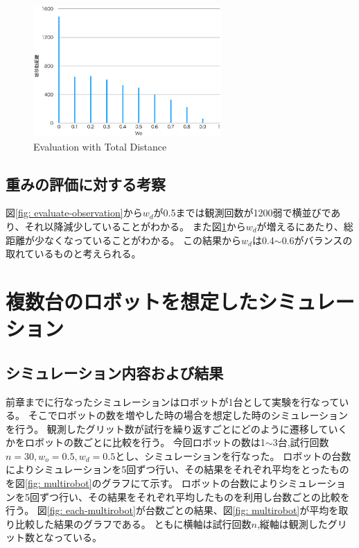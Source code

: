 \documentclass{jsarticle}
\begin{document}
\begin{figure}[tbh]
 \centering
  \includegraphics[height=50mm]{fig/evaluate-distance.eps}
  \vspace*{-4mm}
  \caption{Evaluation with Total Distance}
  \label{fig: evaluate-distance}
\end{figure}

\subsection{重みの評価に対する考察}
図\ref{fig: evaluate-observation}から$w_d$が0.5までは観測回数が1200弱で横並びであり、それ以降減少していることがわかる。
また図\ref{fig: evaluate-distance}から$w_d$が増えるにあたり、総距離が少なくなっていることがわかる。
この結果から$w_d$は0.4$\sim$0.6がバランスの取れているものと考えられる。

\section{複数台のロボットを想定したシミュレーション}
\subsection{シミュレーション内容および結果}

前章までに行なったシミュレーションはロボットが1台として実験を行なっている。
そこでロボットの数を増やした時の場合を想定した時のシミュレーションを行う。
観測したグリット数が試行を繰り返すごとにどのように遷移していくかをロボットの数ごとに比較を行う。
今回ロボットの数は1$\sim$3台,試行回数$n=30,w_o=0.5,w_d=0.5$とし、シミュレーションを行なった。
ロボットの台数によりシミュレーションを5回ずつ行い、その結果をそれぞれ平均をとったものを図\ref{fig: multirobot}のグラフにて示す。
ロボットの台数によりシミュレーションを5回ずつ行い、その結果をそれぞれ平均したものを利用し台数ごとの比較を行う。
図\ref{fig: each-multirobot}が台数ごとの結果、図\ref{fig: multirobot}が平均を取り比較した結果のグラフである。
ともに横軸は試行回数$n$,縦軸は観測したグリット数となっている。
\end{document}
